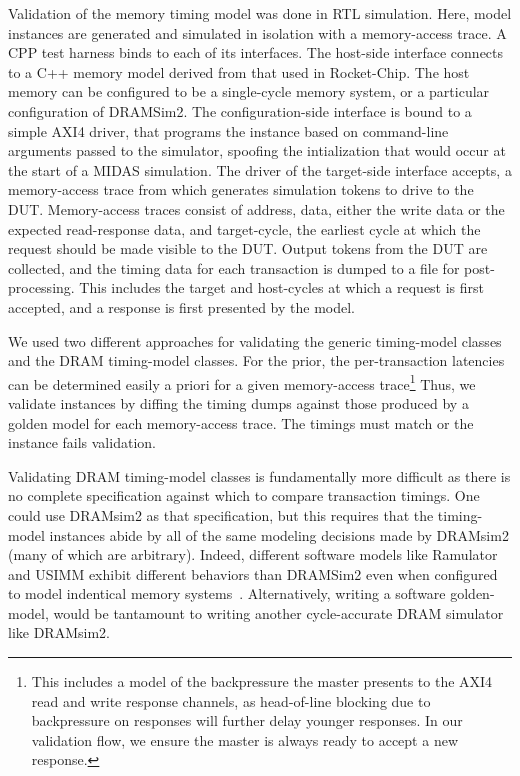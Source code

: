 Validation of the memory timing model was done in RTL simulation. Here, model
instances are generated and simulated in isolation with a memory-access trace.
A CPP test harness binds to each of its interfaces.  The host-side interface
connects to a C++ memory model derived from that used in Rocket-Chip. The host
memory can be configured to be a single-cycle memory system, or a particular
configuration of DRAMSim2.  The configuration-side interface is bound to a
simple AXI4 driver, that programs the instance based on command-line arguments
passed to the simulator, spoofing the intialization that would occur at the
start of a MIDAS simulation. The driver of the target-side interface accepts, a
memory-access trace from which generates simulation tokens to drive to the DUT.
Memory-access traces consist of address, data, either the write data or the
expected read-response data, and target-cycle, the earliest cycle at which the
request should be made visible to the DUT. Output tokens from the DUT are
collected, and the timing data for each transaction is dumped to a file for
post-processing. This includes the target and host-cycles at which a request is
first accepted, and a response is first presented by the model.

We used two different approaches for validating the generic timing-model classes
and the DRAM timing-model classes. For the prior, the per-transaction latencies
can be determined easily a priori for a given memory-access trace\footnote{This
includes a model of the backpressure the master presents to the AXI4 read and
write response channels, as head-of-line blocking due to backpressure on
responses will further delay younger responses.  In our validation flow, we
ensure the master is always ready to accept a new response.} Thus, we validate
instances by diffing the timing dumps against those produced by a golden model
for each memory-access trace. The timings must match or the instance fails
validation.

Validating DRAM timing-model classes is fundamentally more difficult as there
is no complete specification against which to compare transaction timings.
One could use DRAMsim2 as that specification, but this requires that the
timing-model instances abide by all of the same modeling decisions made by
DRAMsim2 (many of which are arbitrary). Indeed, different software models like
Ramulator and USIMM exhibit different behaviors than DRAMSim2 even when
configured to model indentical memory systems~\cite{ramulator}. Alternatively,
writing a software golden-model, would be tantamount to writing another
cycle-accurate DRAM simulator like DRAMsim2.

